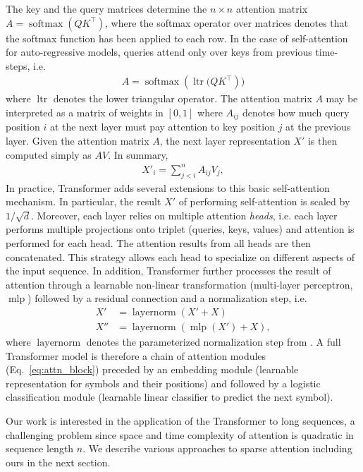 \documentclass[a4paper]{article}
\begin{document}
The key and the query matrices determine the \(n \times n\) 
attention matrix \(A = \operatorname{softmax}\left(QK^\top\right)\),
where the softmax operator over matrices denotes that the softmax function 
has been applied to each row. 
In the case of self-attention for auto-regressive models, queries attend
only over keys from previous time-steps, i.e. 
\begin{align}
A = \operatorname{softmax}\left(\operatorname{ltr}(QK^\top\right))
\end{align}
where $\operatorname{ltr}$ denotes the lower triangular operator.
The attention matrix \(A\) may be interpreted as a matrix of weights 
in \([0, 1]\) where \(A_{ij}\) denotes how much query position \(i\) at the next 
layer must pay attention to key position \(j\) at the previous layer. 
Given the attention matrix \(A\), the next layer representation \(X'\) 
is then computed simply as \(A V\). In summary, 
\begin{align}
X'_i =  \sum_{j < i}^n A_{ij}V_j,
\end{align}
In practice, Transformer \citep{vaswani2017attention} adds several extensions to
this basic self-attention mechanism. 
In particular, the result \(X'\) of performing self-attention is scaled by
\(1/\sqrt{d}\).
Moreover, each layer relies on 
multiple attention \emph{heads}, i.e. each layer performs multiple projections 
onto triplet (queries, keys, values) and attention is performed for each head. 
The attention results from all heads are then concatenated. This strategy allows each 
head 
to specialize on different aspects of the input sequence. In addition, Transformer
further processes the result of attention through a learnable non-linear 
transformation 
(multi-layer perceptron, $\operatorname{mlp}$) followed by a residual connection and 
a normalization step, i.e.
\begin{align}
X' &= \operatorname{layernorm}(X' + X)\\
X'' &= \operatorname{layernorm}(\operatorname{mlp}(X') + X),
\label{eq:attn_block}
\end{align}
where $\operatorname{layernorm}$ denotes the parameterized normalization step 
from \cite{layernorm2016}. A full Transformer model is therefore a chain of
attention modules (Eq.~\ref{eq:attn_block}) preceded by an embedding 
module (learnable representation for symbols and their positions) and followed
by a logistic classification module (learnable linear classifier to predict
the next symbol).

Our work is interested in the application of the Transformer to long sequences,
a challenging problem since space and time complexity of attention is quadratic 
in sequence length \(n\). We describe various approaches to sparse attention 
including ours in the next section.
\end{document}
